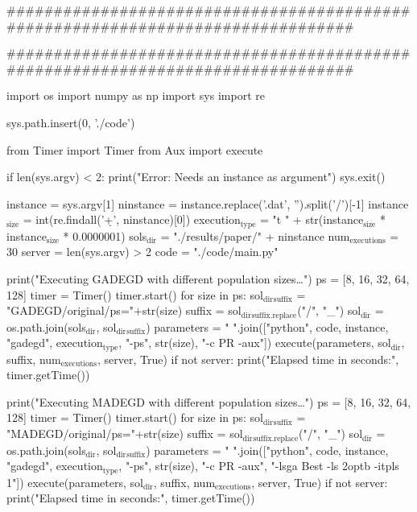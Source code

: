 \documentclass[11pt]{article}
\author{Andrés Herrera Poyatos}
\date{\today}
\title{}
\begin{document}
\tableofcontents

\#\#\#\#\#\#\#\#\#\#\#\#\#\#\#\#\#\#\#\#\#\#\#\#\#\#\#\#\#\#\#\#\#\#\#\#\#\#\#\#\#\#\#\#\#\#\#\#\#\#\#\#\#\#\#\#\#\#\#\#\#\#\#\#\#\#\#\#\#\#\#\#\#\#\#\#\#\#\#\#

\#\#\#\#\#\#\#\#\#\#\#\#\#\#\#\#\#\#\#\#\#\#\#\#\#\#\#\#\#\#\#\#\#\#\#\#\#\#\#\#\#\#\#\#\#\#\#\#\#\#\#\#\#\#\#\#\#\#\#\#\#\#\#\#\#\#\#\#\#\#\#\#\#\#\#\#\#\#\#\#

import os
import numpy as np
import sys
import re

sys.path.insert(0, './code')

from Timer import Timer
from Aux import execute

if len(sys.argv) < 2:
    print("Error: Needs an instance as argument")
    sys.exit()

instance = sys.argv[1]
ninstance = instance.replace('.dat', '').split('/')[-1]
instance\(_{\text{size}}\) = int(re.findall('\d+', ninstance)[0])
execution\(_{\text{type}}\) = "t " + str(instance\(_{\text{size}}\) * instance\(_{\text{size}}\) * 0.0000001)
sols\(_{\text{dir}}\) = "./results/paper/" + ninstance 
num\(_{\text{executions}}\) = 30
server = len(sys.argv) > 2
code = "./code/main.py"

print("Executing GADEGD with different population sizes\ldots{}")
ps = [8, 16, 32, 64, 128]
timer = Timer()
timer.start()
for size in ps:
    sol\(_{\text{dir}}\)\(_{\text{suffix}}\) = "GADEGD/original/ps="+str(size)
    suffix = sol\(_{\text{dir}}\)\(_{\text{suffix.replace}}\)("/", "\_")
    sol\(_{\text{dir}}\) = os.path.join(sols\(_{\text{dir}}\), sol\(_{\text{dir}}\)\(_{\text{suffix}}\))
    parameters = " ".join(["python", code, instance, "gadegd", execution\(_{\text{type}}\), "-ps", str(size), "-c PR -aux"])
    execute(parameters, sol\(_{\text{dir}}\), suffix, num\(_{\text{executions}}\), server, True)
if not server:
    print("Elapsed time in seconds:", timer.getTime())

print("Executing MADEGD with different population sizes\ldots{}")
ps = [8, 16, 32, 64, 128]
timer = Timer()
timer.start()
for size in ps:
    sol\(_{\text{dir}}\)\(_{\text{suffix}}\) = "MADEGD/original/ps="+str(size)
    suffix = sol\(_{\text{dir}}\)\(_{\text{suffix.replace}}\)("/", "\_")
    sol\(_{\text{dir}}\) = os.path.join(sols\(_{\text{dir}}\), sol\(_{\text{dir}}\)\(_{\text{suffix}}\))
    parameters = " ".join(["python", code, instance, "gadegd", execution\(_{\text{type}}\), "-ps", str(size), "-c PR -aux",
                           "-lsga Best -ls 2optb -itpls 1"])
    execute(parameters, sol\(_{\text{dir}}\), suffix, num\(_{\text{executions}}\), server, True)
if not server:
    print("Elapsed time in seconds:", timer.getTime())
\end{document}
